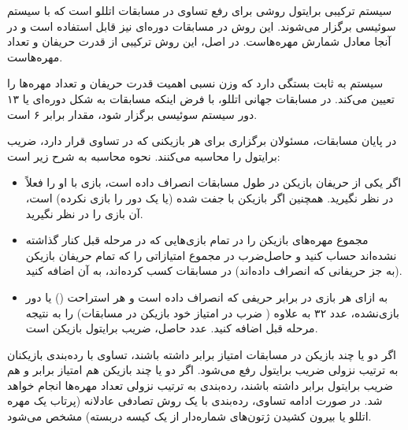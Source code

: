 


سیستم ترکیبی برایتول روشی برای رفع تساوی در مسابقات اتللو است که با سیستم سوئیسی برگزار می‌شوند. این روش در مسابقات دوره‌ای نیز قابل استفاده است و در آنجا معادل شمارش مهره‌هاست. در اصل، این روش ترکیبی از قدرت حریفان و تعداد مهره‌هاست.


سیستم  به ثابت  بستگی دارد که وزن نسبی اهمیت قدرت حریفان و تعداد مهره‌ها را تعیین می‌کند. در مسابقات جهانی اتللو، با فرض اینکه مسابقات به شکل دوره‌ای یا ۱۳ دور سیستم سوئیسی برگزار شود، مقدار  برابر ۶ است.


در پایان مسابقات، مسئولان برگزاری برای هر بازیکنی که در تساوی قرار دارد، ضریب برایتول را محاسبه می‌کنند. نحوه محاسبه به شرح زیر است:

\begin{itemize}
  \item اگر یکی از حریفان بازیکن در طول مسابقات انصراف داده است، بازی با او را فعلاً در نظر نگیرید. همچنین اگر بازیکن با  جفت شده (یا یک دور را بازی نکرده) است، آن بازی را در نظر نگیرید.
  \item مجموع مهره‌های بازیکن را در تمام بازی‌هایی که در مرحله قبل کنار گذاشته نشده‌اند حساب کنید و حاصل‌ضرب  در مجموع امتیازاتی را که تمام حریفان بازیکن (به جز حریفانی که انصراف داده‌اند) در مسابقات کسب کرده‌اند، به آن اضافه کنید.
  \item به ازای هر بازی در برابر حریفی که انصراف داده است و هر استراحت () یا دور بازی‌نشده، عدد ۳۲ به علاوه ( ضرب در امتیاز خود بازیکن در مسابقات) را به نتیجه مرحله قبل اضافه کنید. عدد حاصل، ضریب برایتول بازیکن است.
\end{itemize}


اگر دو یا چند بازیکن در مسابقات امتیاز برابر داشته باشند، تساوی با رده‌بندی بازیکنان به ترتیب نزولی ضریب برایتول رفع می‌شود. اگر دو یا چند بازیکن هم امتیاز برابر و هم ضریب برایتول برابر داشته باشند، رده‌بندی به ترتیب نزولی تعداد مهره‌ها انجام خواهد شد. در صورت ادامه تساوی، رده‌بندی با یک روش تصادفی عادلانه (پرتاب یک مهره اتللو یا بیرون کشیدن ژتون‌های شماره‌دار از یک کیسه دربسته) مشخص می‌شود.
